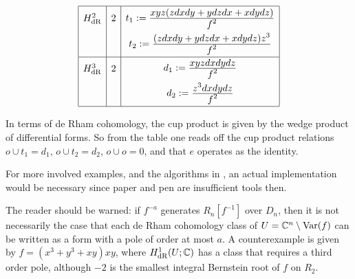 \begin{example}
\begin{figure}
\[\begin{array}{|c|c|c|}
\hline
H^2_{{\rm dR}}&2&\sp{t_1:=\frac{\displaystyle xyz(zdxdy+ydzdx+xdydz)}{\displaystyle f^2}}\\
        & &\sp{t_2:=\frac{\displaystyle (zdxdy+ydzdx+xdydz)z^3}{\displaystyle f^2}}\\
\hline
H^3_{{\rm dR}}&2&\sp{d_1:=\frac{\displaystyle xyzdxdydz}{\displaystyle f^2}}\\
        & &\sp{d_2:=\frac{\displaystyle z^3dxdydz}{\displaystyle f^2}}\\
\hline
\end{array}
\]
\caption{}\label{Figure}
\end{figure}
In terms of de Rham cohomology, the cup product is given by the wedge
product of differential forms. So 
from the table one reads off the cup  product
relations
$o\cup t_1=d_1$, $o\cup t_2=d_2$, $o\cup
o=0$, and that $e$ operates as the identity. 
\end{example}
For more involved examples, and the algorithms in \cite{DM:W4}, an
actual implementation would be  necessary since paper and pen are
insufficient tools then.
\begin{remark}
The reader should be warned: if $f^{-a}$ generates $R_n[f^{-1}]$ over
$D_n$, then it is not necessarily the case that each de Rham
cohomology class of $U={\mathbb C}^n\setminus\operatorname{Var}(f)$ can be written as a form
with a pole of order at most $a$. A counterexample is given by
$f=(x^3+y^3+xy)xy$, where $H^1_{{\rm dR}}(U;{\mathbb C})$ has a class that requires a
third order pole, although $-2$ is the smallest integral Bernstein root
of $f$ on $R_2$.
\end{remark}

